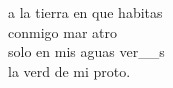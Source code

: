 \begin{cancion}%
	a la tierra en que habitas\\
	 conmigo mar atro\\
	solo en mis aguas ver__s\\
	la verd de mi proto.\\
\end{cancion}%
